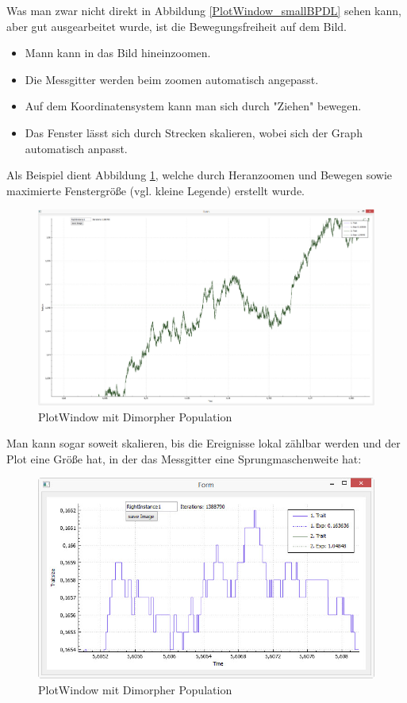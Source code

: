 \documentclass[11pt, a4paper, german]{article}
\theoremstyle{plain}
\begin{document}
	Was man zwar nicht direkt in Abbildung \ref{PlotWindow_smallBPDL} sehen kann, aber gut ausgearbeitet wurde, ist die Bewegungsfreiheit auf dem Bild.\\
	\begin{itemize}
		\item Mann kann in das Bild hineinzoomen.
		\item Die Messgitter werden beim zoomen automatisch angepasst.
		\item Auf dem Koordinatensystem kann man sich durch "{}Ziehen"{} bewegen.
		\item Das Fenster lässt sich durch Strecken skalieren, wobei sich der Graph automatisch anpasst.
	\end{itemize}
	Als Beispiel dient Abbildung \ref{PlotWindow_zoomedBPDLmaximized}, welche durch Heranzoomen und Bewegen sowie maximierte Fenstergröße (vgl. kleine Legende) erstellt wurde.
	\begin{figure}[H]
		\centering
		\includegraphics[width=0.9\linewidth]{./Pictures/PlotWindow_zoomedBPDLmaximized}
		\caption[PlotWindow]{PlotWindow mit Dimorpher Population}
		\label{PlotWindow_zoomedBPDLmaximized}
	\end{figure}
	Man kann sogar soweit skalieren, bis die Ereignisse lokal zählbar werden und der Plot eine Größe hat, in der das Messgitter eine Sprungmaschenweite hat:
	\begin{figure}[H]
		\centering
		\includegraphics[width=0.9\linewidth]{./Pictures/PlotWindow_zoomedBPDL_Stepview}
		\caption[PlotWindow]{PlotWindow mit Dimorpher Population}
		\label{PlotWindow_zoomedBPDL_Stepview}
	\end{figure}	
	
\end{document}

